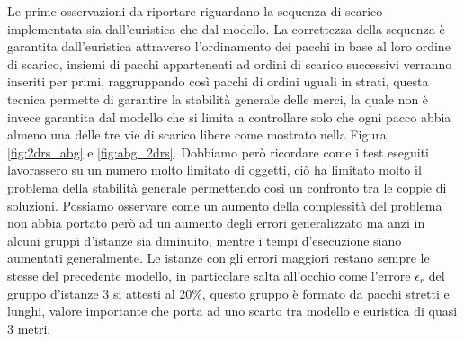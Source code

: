 Le prime osservazioni da riportare riguardano la sequenza di scarico implementata sia dall'euristica che dal modello.
La correttezza della sequenza è garantita dall'euristica attraverso l'ordinamento dei pacchi in base al loro ordine di scarico, insiemi di pacchi appartenenti ad ordini di scarico successivi verranno inseriti per primi, raggruppando così pacchi di ordini uguali in strati, questa tecnica permette di garantire la stabilità generale delle merci, la quale non è invece garantita dal modello che si limita a controllare solo che ogni pacco abbia almeno una delle tre vie di scarico libere come mostrato nella Figura \ref{fig:2drs_abg} e \ref{fig:abg_2drs}. Dobbiamo però ricordare come i test eseguiti lavorassero su un numero molto limitato di oggetti, ciò ha limitato molto il problema della stabilità generale permettendo così un confronto tra le coppie di soluzioni.
Possiamo osservare come un aumento della complessità del problema non abbia portato però ad un aumento degli errori generalizzato ma anzi in alcuni gruppi d'istanze sia diminuito, mentre i tempi d'esecuzione siano aumentati generalmente. Le istanze con gli errori maggiori restano sempre le stesse del precedente modello, in particolare salta all'occhio come l'errore $\epsilon_r$ del gruppo d'istanze 3 si attesti al 20\%, questo gruppo è formato da pacchi stretti e lunghi, valore importante che porta ad uno scarto tra modello e euristica di quasi 3 metri.

